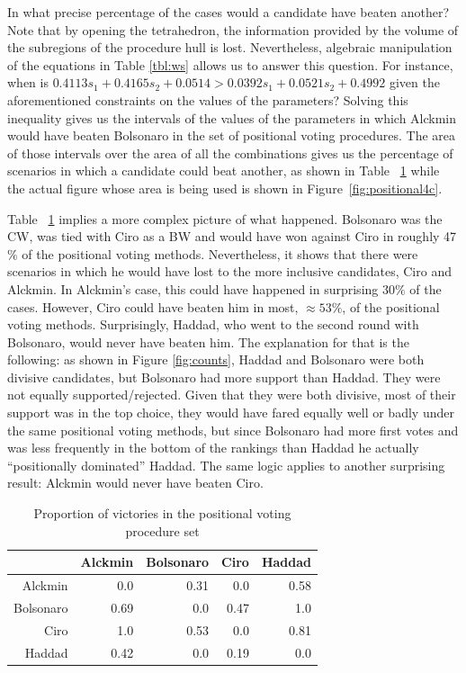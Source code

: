 \documentclass[hidelinks,11pt]{article} \usepackage[utf8]{inputenc}
\begin{document}
In what precise percentage of the cases would a candidate have beaten another?
Note that by opening the tetrahedron, the information provided by the volume of
the subregions of the procedure hull is lost. Nevertheless, algebraic
manipulation of the equations in Table \ref{tbl:ws} allows us to answer this
question. For instance, when is \( 0.4113 s_{1} + 0.4165 s_2 + 0.0514 >
0.0392 s_{1} + 0.0521 s_2 + 0.4992 \) given the aforementioned constraints
on the values of the parameters? Solving this inequality gives us the intervals
of the values of the parameters in which Alckmin would have beaten Bolsonaro in
the set of positional voting procedures. The area of those intervals over the
area of all the combinations gives us the percentage of scenarios in which a
candidate could beat another, as shown in Table ~\ref{tbl:ctn} while the actual
figure whose area is being used is shown in Figure~\ref{fig:positional4c}.

Table ~\ref{tbl:ctn} implies a more complex picture of what happened. Bolsonaro
was the CW, was tied with Ciro as a BW and would have won against Ciro in
roughly 47\(\%\) of the positional voting methods. Nevertheless, it shows that
there were scenarios in which he would have lost to the more inclusive
candidates, Ciro and Alckmin. In Alckmin's case, this could have happened in
surprising \(30\%\) of the cases. However, Ciro could have beaten him in most,
\(\approx 53\%\), of the positional voting methods. Surprisingly, Haddad, who
went to the second round with Bolsonaro, would never have beaten him. The
explanation for that is the following: as shown in Figure \ref{fig:counts},
Haddad and Bolsonaro were both divisive candidates, but Bolsonaro had more
support than Haddad. They were not equally supported/rejected. Given that they
were both divisive, most of their support was in the top choice, they would have
fared equally well or badly under the same positional voting methods, but since
Bolsonaro had more first votes and was less frequently in the bottom of the
rankings than Haddad he actually ``positionally dominated'' Haddad. The same
logic applies to another surprising result: Alckmin would never have beaten
Ciro.


\begin{table}[H]
  \centering
  \begin{tabular}{rrrrr}
    \hline
     & Alckmin & Bolsonaro & Ciro & Haddad \\
    \hline
    Alckmin & 0.0 & 0.31 & 0.0 & 0.58 \\
    Bolsonaro & 0.69 & 0.0 & 0.47 & 1.0 \\
    Ciro & 1.0 & 0.53 & 0.0 & 0.81 \\
    Haddad & 0.42 & 0.0 & 0.19 & 0.0 \\\hline\hline
  \end{tabular}
   \caption{Proportion of victories in the positional voting procedure set}
\label{tbl:ctn}
\end{table}
\end{document}
